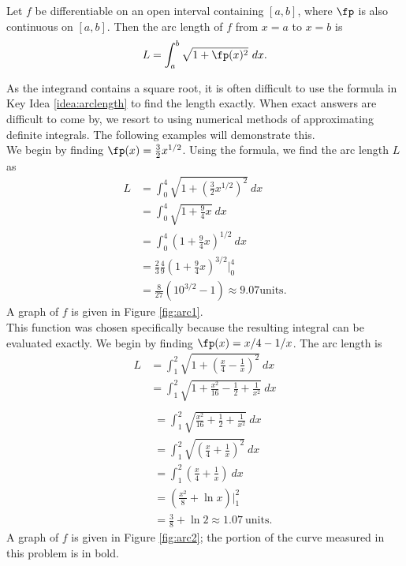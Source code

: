 {Let $f$ be differentiable on an open interval containing $[a,b]$, where $\fp$ is also continuous on $[a,b]$. Then the arc length of $f$ from $x=a$ to $x=b$ is
$$L = \int_a^b \sqrt{1+\fp(x)^2}\ dx.$$
}

As the integrand contains a square root, it is often difficult to use the formula in Key Idea \ref{idea:arclength} to find the length exactly. When exact answers are difficult to come by, we resort to using numerical methods of approximating definite integrals. The following examples will demonstrate this.\\

{We begin by finding $\fp(x)= \frac32x^{1/2}$. Using the formula, we find the arc length $L$ as
\begin{align*}
	L &=	\int_0^4 \sqrt{1+\left(\frac32x^{1/2}\right)^2}\ dx \\
		&=	\int_0^4 \sqrt{1+\frac94x} \ dx \\
		&= 	\int_0^4 \left(1+\frac94x\right)^{1/2}\ dx \\
		&=  \frac23\frac49\left(1+\frac94x\right)^{3/2}\Big|_0^4 \\
		&=\frac{8}{27}\left(10^{3/2}-1\right) \approx 9.07 \text{units}.
\end{align*}
	A graph of $f$ is given in Figure \ref{fig:arc1}. 
}\\

{This function was chosen specifically because the resulting integral can be evaluated exactly. We begin by finding $\fp(x) = x/4-1/x$. The arc length is 
\begin{align*}
L		&=  \int_1^2 \sqrt{1+ \left(\frac x4-\frac1x\right)^2}\ dx \\
		&= 	\int_1^2 \sqrt{1 + \frac{x^2}{16} -\frac12 + \frac1{x^2} } \ dx \\
\end{align*}
\begin{align*}
\phantom{L}
		&=	\int_1^2 \sqrt{\frac{x^2}{16} +\frac12 + \frac1{x^2} } \ dx \\
		&=	\int_1^2	\sqrt{ \left(\frac x4 + \frac1x\right)^2}\ dx \\
		&= \int_1^2 \left(\frac x4 + \frac1x\right) \ dx \\
		&=  \left(\frac{x^2}8 + \ln x\right)\Bigg|_1^2\\
		&=	\frac38+\ln 2 \approx 1.07 \ \text{units}.
\end{align*}
A graph of $f$ is given in Figure \ref{fig:arc2}; the portion of the curve measured in this problem is in bold.
}\\

